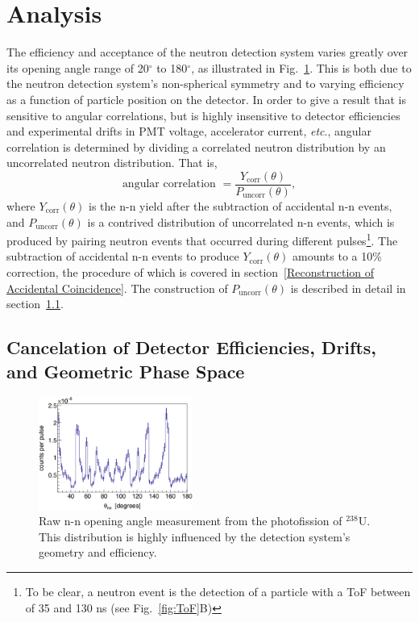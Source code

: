 \documentclass[%
 reprint,
 amsmath,amssymb,
 aps,
 nofootinbib
]{revtex4-1}
\begin{document}
\section{Analysis}
\label{Analysis}
The efficiency and acceptance of the neutron detection system varies greatly over its opening angle range of 20$^{\circ}$ to 180$^{\circ}$, as illustrated in Fig.~\ref{fig:DetAcceptance}.
This is both due to the neutron detection system's non-spherical symmetry and to varying efficiency as a function of particle position on the detector.
In order to give a result that is sensitive to angular correlations, but is highly insensitive to detector efficiencies and experimental drifts in PMT voltage, accelerator current, \emph{etc}., angular correlation is determined by dividing a correlated neutron distribution by an uncorrelated neutron distribution. That is,
\begin{equation}
\label{eq:angularCorr}
\text{angular correlation }  = \frac{Y_{\text{corr}}(\theta)}{P_{\text{uncorr}}(\theta)},
\end{equation}
where $Y_{\text{corr}}(\theta)$ is the n-n yield after the subtraction of accidental n-n events, and $P_{\text{uncorr}}(\theta)$ is a contrived distribution of uncorrelated n-n events, which is produced by pairing neutron events that occurred during different pulses\footnote{To be clear, a neutron event is the detection of a particle with a ToF between of 35 and 130 ns (see Fig.~\ref{fig:ToF}B)}. The subtraction of accidental n-n events to produce $Y_{\text{corr}}(\theta)$ amounts to a 10\% correction, the procedure of which is covered in section~\ref{Reconstruction of Accidental Coincidence}. The construction of $P_{\text{uncorr}}(\theta)$ is described in detail in section~\ref{subsec:SPDPCancelation}.

\subsection{Cancelation of Detector Efficiencies, Drifts, and Geometric Phase Space}
\label{subsec:SPDPCancelation}
\begin{figure}[h]
\includegraphics[width=0.45\textwidth]{DetAcceptance.png}
\caption{Raw n-n opening angle measurement from the photofission of $^{238}$U. 
This distribution is highly influenced by the detection system's geometry and efficiency.
}
\label{fig:DetAcceptance}
\end{figure}
\end{document}
